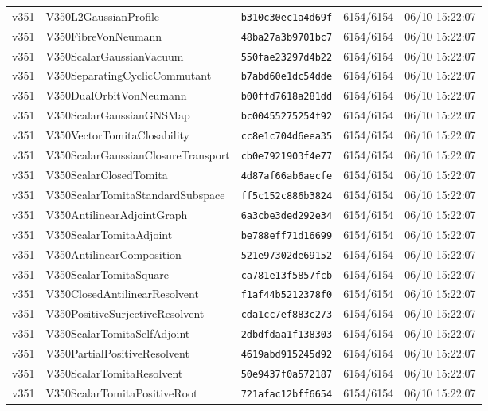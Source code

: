 \documentclass[11pt]{article}
\theoremstyle{definition}\newtheorem{deriv}{Derivação}
\begin{document}
{\begin{longtable}{@{}lllll@{}}
v351 & V350L2GaussianProfile & \texttt{b310c30ec1a4d69f} & 6154/6154 & 06/10 15:22:07 \\
v351 & V350FibreVonNeumann & \texttt{48ba27a3b9701bc7} & 6154/6154 & 06/10 15:22:07 \\
v351 & V350ScalarGaussianVacuum & \texttt{550fae23297d4b22} & 6154/6154 & 06/10 15:22:07 \\
v351 & V350SeparatingCyclicCommutant & \texttt{b7abd60e1dc54dde} & 6154/6154 & 06/10 15:22:07 \\
v351 & V350DualOrbitVonNeumann & \texttt{b00ffd7618a281dd} & 6154/6154 & 06/10 15:22:07 \\
v351 & V350ScalarGaussianGNSMap & \texttt{bc00455275254f92} & 6154/6154 & 06/10 15:22:07 \\
v351 & V350VectorTomitaClosability & \texttt{cc8e1c704d6eea35} & 6154/6154 & 06/10 15:22:07 \\
v351 & V350ScalarGaussianClosureTransport & \texttt{cb0e7921903f4e77} & 6154/6154 & 06/10 15:22:07 \\
v351 & V350ScalarClosedTomita & \texttt{4d87af66ab6aecfe} & 6154/6154 & 06/10 15:22:07 \\
v351 & V350ScalarTomitaStandardSubspace & \texttt{ff5c152c886b3824} & 6154/6154 & 06/10 15:22:07 \\
v351 & V350AntilinearAdjointGraph & \texttt{6a3cbe3ded292e34} & 6154/6154 & 06/10 15:22:07 \\
v351 & V350ScalarTomitaAdjoint & \texttt{be788eff71d16699} & 6154/6154 & 06/10 15:22:07 \\
v351 & V350AntilinearComposition & \texttt{521e97302de69152} & 6154/6154 & 06/10 15:22:07 \\
v351 & V350ScalarTomitaSquare & \texttt{ca781e13f5857fcb} & 6154/6154 & 06/10 15:22:07 \\
v351 & V350ClosedAntilinearResolvent & \texttt{f1af44b5212378f0} & 6154/6154 & 06/10 15:22:07 \\
v351 & V350PositiveSurjectiveResolvent & \texttt{cda1cc7ef883c273} & 6154/6154 & 06/10 15:22:07 \\
v351 & V350ScalarTomitaSelfAdjoint & \texttt{2dbdfdaa1f138303} & 6154/6154 & 06/10 15:22:07 \\
v351 & V350PartialPositiveResolvent & \texttt{4619abd915245d92} & 6154/6154 & 06/10 15:22:07 \\
v351 & V350ScalarTomitaResolvent & \texttt{50e9437f0a572187} & 6154/6154 & 06/10 15:22:07 \\
v351 & V350ScalarTomitaPositiveRoot & \texttt{721afac12bff6654} & 6154/6154 & 06/10 15:22:07 \\

\end{longtable}}
\end{document}
